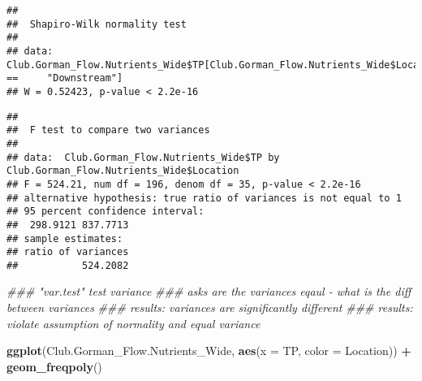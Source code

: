 \documentclass[]{article}
\newenvironment{Shaded}{\begin{snugshade}}{\end{snugshade}}
\newcommand{\CommentTok}[1]{\textcolor[rgb]{0.56,0.35,0.01}{\textit{#1}}}
\newcommand{\DataTypeTok}[1]{\textcolor[rgb]{0.13,0.29,0.53}{#1}}
\newcommand{\KeywordTok}[1]{\textcolor[rgb]{0.13,0.29,0.53}{\textbf{#1}}}
\newcommand{\NormalTok}[1]{#1}
\newcommand{\OperatorTok}[1]{\textcolor[rgb]{0.81,0.36,0.00}{\textbf{#1}}}
\newcommand{\StringTok}[1]{\textcolor[rgb]{0.31,0.60,0.02}{#1}}
\begin{document}
\begin{Shaded}
\end{Shaded}

\begin{verbatim}
## 
##  Shapiro-Wilk normality test
## 
## data:  Club.Gorman_Flow.Nutrients_Wide$TP[Club.Gorman_Flow.Nutrients_Wide$Location ==     "Downstream"]
## W = 0.52423, p-value < 2.2e-16
\end{verbatim}

\begin{Shaded}
\end{Shaded}

\begin{verbatim}
## 
##  F test to compare two variances
## 
## data:  Club.Gorman_Flow.Nutrients_Wide$TP by Club.Gorman_Flow.Nutrients_Wide$Location
## F = 524.21, num df = 196, denom df = 35, p-value < 2.2e-16
## alternative hypothesis: true ratio of variances is not equal to 1
## 95 percent confidence interval:
##  298.9121 837.7713
## sample estimates:
## ratio of variances 
##           524.2082
\end{verbatim}

\begin{Shaded}
\begin{Highlighting}[]
\CommentTok{### "var.test" test variance }
\CommentTok{### asks are the variances eqaul - what is the diff between variances }
\CommentTok{### results: variances are significantly different }
\CommentTok{### results: violate assumption of normality and equal variance}

\KeywordTok{ggplot}\NormalTok{(Club.Gorman_Flow.Nutrients_Wide, }\KeywordTok{aes}\NormalTok{(}\DataTypeTok{x =}\NormalTok{ TP, }\DataTypeTok{color =}\NormalTok{ Location)) }\OperatorTok{+}
\StringTok{  }\KeywordTok{geom_freqpoly}\NormalTok{()}
\end{Highlighting}
\end{Shaded}
\end{document}

